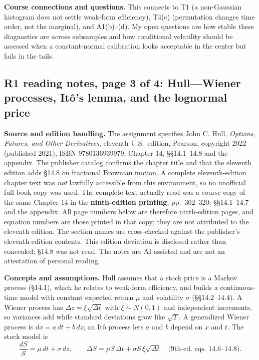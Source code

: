 \textbf{Course connections and questions.} This connects to T1 (a non-Gaussian histogram does not settle weak-form efficiency), T4(c) (permutation changes time order, not the marginal), and A1(b)--(d). My open questions are how stable these diagnostics are across subsamples and how conditional volatility should be assessed when a constant-normal calibration looks acceptable in the center but fails in the tails.
\clearpage

\subsection*{R1 reading notes, page 3 of 4: Hull---Wiener processes, It\^o's lemma, and the lognormal price}
\textbf{Source and edition handling.} The assignment specifies John C. Hull, \emph{Options, Futures, and Other Derivatives}, eleventh U.S.\ edition, Pearson, copyright 2022 (published 2021), ISBN 9780136939979, Chapter 14, \S\S14.1--14.8 and the appendix. The publisher catalog confirms the chapter title and that the eleventh edition adds \S14.8 on fractional Brownian motion. A complete eleventh-edition chapter text was \emph{not} lawfully accessible from this environment, so no unofficial full-book copy was used. The complete text actually read was a course copy of the same Chapter 14 in the \textbf{ninth-edition printing}, pp.~302--320: \S\S14.1--14.7 and the appendix. All page numbers below are therefore ninth-edition pages, and equation numbers are those printed in that copy; they are not attributed to the eleventh edition. The section names are cross-checked against the publisher's eleventh-edition contents. This edition deviation is disclosed rather than concealed; \S14.8 was not read. The notes are AI-assisted and are not an attestation of personal reading.

\textbf{Concepts and assumptions.} Hull assumes that a stock price is a Markov process (\S14.1), which he relates to weak-form efficiency, and builds a continuous-time model with constant expected return $\mu$ and volatility $\sigma$ (\S\S14.2--14.4). A Wiener process has $\Delta z=\xi\sqrt{\Delta t}$ with $\xi\sim N(0,1)$ and independent increments, so variances add while standard deviations grow like $\sqrt{T}$. A generalized Wiener process is $dx=a\,dt+b\,dz$; an It\^o process lets $a$ and $b$ depend on $x$ and $t$. The stock model is
\[
 \frac{dS}{S}=\mu\,dt+\sigma\,dz,
 \qquad
 \Delta S=\mu S\,\Delta t+\sigma S\,\xi\sqrt{\Delta t}
 \quad \text{(9th-ed.\ eqs.~14.6--14.8)}.
\]
